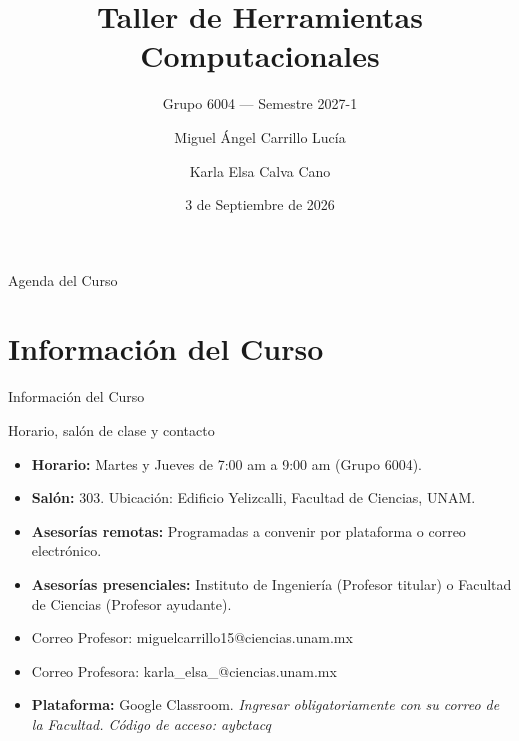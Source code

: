\documentclass[aspectratio=169, 10pt]{beamer}
\title[Taller de Herramientas Computacionales]{\Large{\bf Taller de Herramientas Computacionales}}
\subtitle{Grupo 6004 — Semestre 2027-1}
\author[Profesor y Ayudante]{\Large{Miguel Ángel Carrillo Lucía}     \and \hspace{10mm}    \Large{Karla Elsa Calva Cano}}
\institute[UNAM - FC]{
    \large{Universidad Nacional Autónoma de México}\\
    \large{Facultad de Ciencias}\\
    \large{Licenciatura en Matemáticas Aplicadas}
}
\date{3 de Septiembre de 2026}
\begin{document}
\begin{frame}
    \titlepage
\end{frame}

\begin{frame}{Agenda del Curso}
    \tableofcontents[sectionstyle=show,subsectionstyle=show/shaded]
\end{frame}

\section{Información del Curso}
\begin{frame}{Información del Curso}
    \vspace{2mm}
    \begin{block}{Horario, salón de clase y contacto}
    \begin{itemize}\justifying
        \item \textbf{Horario:} Martes y Jueves de 7:00 am a 9:00 am (Grupo 6004). \pause
        \item \textbf{Salón:} 303. Ubicación: Edificio Yelizcalli, Facultad de Ciencias, UNAM. \pause
        \item \textbf{Asesorías remotas:} Programadas a convenir por plataforma o correo electrónico. \pause
        \item \textbf{Asesorías presenciales:} Instituto de Ingeniería (Profesor titular) o Facultad de Ciencias (Profesor ayudante). \pause
         \item Correo Profesor: miguelcarrillo15@ciencias.unam.mx
         \item Correo Profesora: karla\_elsa\_@ciencias.unam.mx
        \item \textbf{Plataforma:} Google Classroom. \textit{Ingresar obligatoriamente con su correo de la Facultad. Código de acceso: aybctacq}
    \end{itemize}
    \end{block}
\end{frame}


\end{document}
